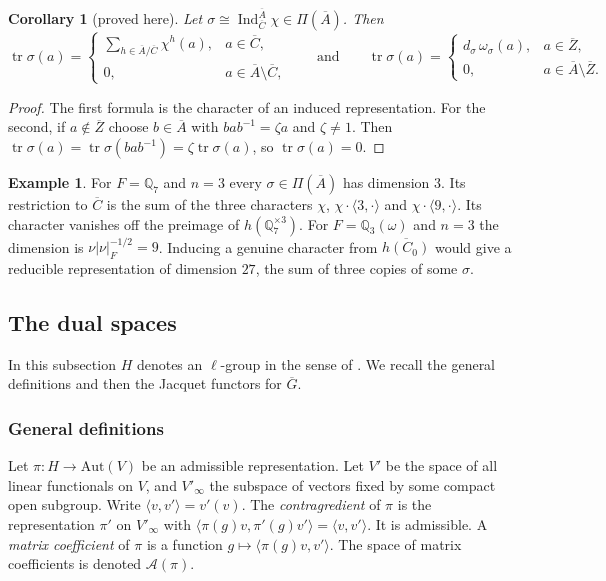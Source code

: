 \documentclass[12pt,letterpaper]{article}
\numberwithin{equation}{section}
\newtheorem{corollary}[theorem]{Corollary}
\theoremstyle{definition}
\newtheorem{xexample}[theorem]{Example}
\newcommand{\proved}{proved here}
\newcommand{\Q}{\mathbb Q}
\newcommand{\bG}{\overline{G}}
\newcommand{\bA}{\overline{A}}
\newcommand{\bC}{\overline{C}}
\newcommand{\bZ}{\overline{Z}}
\DeclareMathOperator{\tr}{tr}
\DeclareMathOperator{\Ind}{Ind}
\begin{document}
\begin{corollary}[\proved]\label{cor:torus-trace}
Let $\sigma\cong\Ind_{\bC}^{\bA}\chi\in\Pi(\bA)$.  Then
\[
\tr\sigma(a)=\begin{cases}\sum_{h\in\bA/\bC}\chi^h(a),& a\in\bC,\\ 0,& a\in\bA\setminus\bC,\end{cases}
\qquad\text{and}\qquad
\tr\sigma(a)=\begin{cases}d_\sigma\,\omega_\sigma(a),& a\in\bZ,\\ 0,& a\in\bA\setminus\bZ.\end{cases}
\]
\end{corollary}
\begin{proof}
The first formula is the character of an induced representation.  For the second, if
$a\notin\bZ$ choose $b\in\bA$ with $bab^{-1}=\zeta a$ and $\zeta\ne1$.  Then
$\tr\sigma(a)=\tr\sigma(bab^{-1})=\zeta\tr\sigma(a)$, so $\tr\sigma(a)=0$.
\end{proof}

\begin{xexample}\label{ex:sigma-Q7}
For $F=\Q_7$ and $n=3$ every $\sigma\in\Pi(\bA)$ has dimension $3$.  Its restriction to
$\bC$ is the sum of the three characters $\chi$, $\chi\cdot\langle 3,\cdot\rangle$ and
$\chi\cdot\langle 9,\cdot\rangle$.  Its character vanishes off the preimage of
$h(\Q_7^{\times3})$.  For $F=\Q_3(\omega)$ and $n=3$ the dimension is
$\nu|\nu|_F^{-1/2}=9$.  Inducing a genuine character from $\overline{h(C_0)}$ would give a
reducible representation of dimension $27$, the sum of three copies of some $\sigma$.
\end{xexample}

\subsection{The dual spaces}\label{subsec:duals}

In this subsection $H$ denotes an $\ell$-group in the sense of \cite{BZ76}.  We recall the
general definitions and then the Jacquet functors for $\bG$.

\subsubsection{General definitions}

Let $\pi:H\to\mathrm{Aut}(V)$ be an admissible representation.  Let $V'$ be the space of all
linear functionals on $V$, and $V'_\infty$ the subspace of vectors fixed by some compact open
subgroup.  Write $\langle v,v'\rangle=v'(v)$.  The \emph{contragredient} of $\pi$ is the
representation $\pi'$ on $V'_\infty$ with
$\langle\pi(g)v,\pi'(g)v'\rangle=\langle v,v'\rangle$.  It is admissible.  A \emph{matrix
coefficient} of $\pi$ is a function $g\mapsto\langle\pi(g)v,v'\rangle$.  The space of
matrix coefficients is denoted $\mathcal A(\pi)$.
\end{document}
